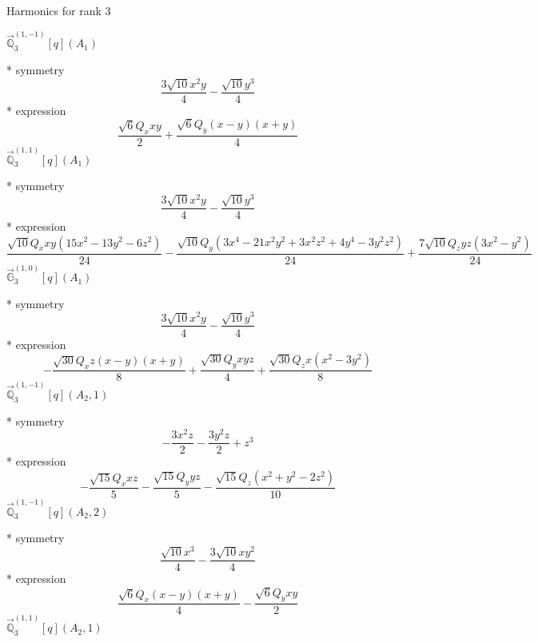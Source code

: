 \documentclass[fleqn,8pt]{jsarticle}
\begin{document}
\noindent * Harmonics for rank 3

\noindent\quad $\vec{\mathbb{Q}}_{3}^{(1,-1)}[q](A_{1})$

\noindent\quad ** symmetry
\begin{dmath*}
\frac{3 \sqrt{10} x^{2} y}{4} - \frac{\sqrt{10} y^{3}}{4}
\end{dmath*}
\noindent\quad ** expression
\begin{dmath*}
\frac{\sqrt{6} Q_{x} x y}{2} + \frac{\sqrt{6} Q_{y} \left(x - y\right) \left(x + y\right)}{4}
\end{dmath*}
\noindent\quad $\vec{\mathbb{Q}}_{3}^{(1,1)}[q](A_{1})$

\noindent\quad ** symmetry
\begin{dmath*}
\frac{3 \sqrt{10} x^{2} y}{4} - \frac{\sqrt{10} y^{3}}{4}
\end{dmath*}
\noindent\quad ** expression
\begin{dmath*}
\frac{\sqrt{10} Q_{x} x y \left(15 x^{2} - 13 y^{2} - 6 z^{2}\right)}{24} - \frac{\sqrt{10} Q_{y} \left(3 x^{4} - 21 x^{2} y^{2} + 3 x^{2} z^{2} + 4 y^{4} - 3 y^{2} z^{2}\right)}{24} + \frac{7 \sqrt{10} Q_{z} y z \left(3 x^{2} - y^{2}\right)}{24}
\end{dmath*}
\noindent\quad $\vec{\mathbb{G}}_{3}^{(1,0)}[q](A_{1})$

\noindent\quad ** symmetry
\begin{dmath*}
\frac{3 \sqrt{10} x^{2} y}{4} - \frac{\sqrt{10} y^{3}}{4}
\end{dmath*}
\noindent\quad ** expression
\begin{dmath*}
- \frac{\sqrt{30} Q_{x} z \left(x - y\right) \left(x + y\right)}{8} + \frac{\sqrt{30} Q_{y} x y z}{4} + \frac{\sqrt{30} Q_{z} x \left(x^{2} - 3 y^{2}\right)}{8}
\end{dmath*}
\noindent\quad $\vec{\mathbb{Q}}_{3}^{(1,-1)}[q](A_{2},1)$

\noindent\quad ** symmetry
\begin{dmath*}
- \frac{3 x^{2} z}{2} - \frac{3 y^{2} z}{2} + z^{3}
\end{dmath*}
\noindent\quad ** expression
\begin{dmath*}
- \frac{\sqrt{15} Q_{x} x z}{5} - \frac{\sqrt{15} Q_{y} y z}{5} - \frac{\sqrt{15} Q_{z} \left(x^{2} + y^{2} - 2 z^{2}\right)}{10}
\end{dmath*}
\noindent\quad $\vec{\mathbb{Q}}_{3}^{(1,-1)}[q](A_{2},2)$

\noindent\quad ** symmetry
\begin{dmath*}
\frac{\sqrt{10} x^{3}}{4} - \frac{3 \sqrt{10} x y^{2}}{4}
\end{dmath*}
\noindent\quad ** expression
\begin{dmath*}
\frac{\sqrt{6} Q_{x} \left(x - y\right) \left(x + y\right)}{4} - \frac{\sqrt{6} Q_{y} x y}{2}
\end{dmath*}
\noindent\quad $\vec{\mathbb{Q}}_{3}^{(1,1)}[q](A_{2},1)$
\end{document}
